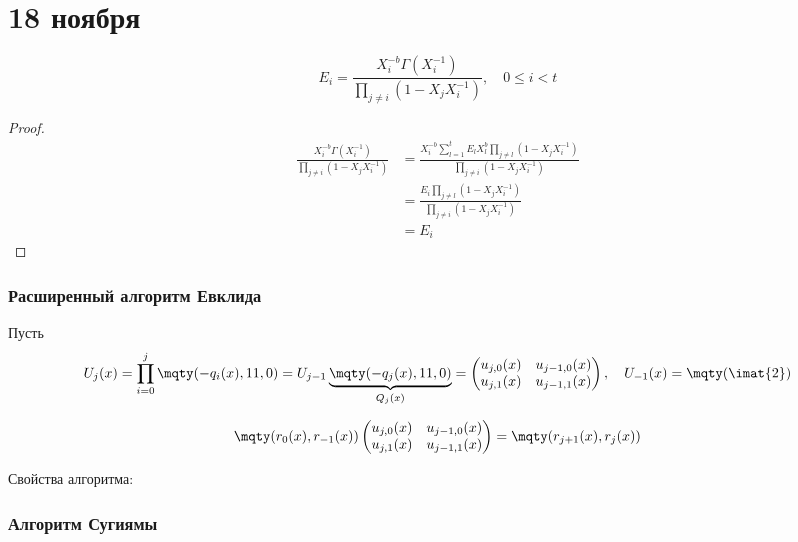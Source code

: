 \chapter{18 ноября}

\unfinished

\begin{theorem}
    \[E_i = \frac{X_i^{ -b} \Gamma(X_i^{-1})}{\prod_{j\neq i} (1 - X_j X_i^{-1})}, \quad 0 \leq i < t\]
\end{theorem}
\begin{proof}
    \begin{align*}
        \frac{X_i^{ -b} \Gamma(X_i^{-1})}{\prod_{j\neq i} (1 - X_j X_i^{-1})}
        & = \frac{X_i^{ -b} \sum_{l = 1}^t E_l X_l^b \prod_{j \neq l} (1 - X_jX_i^{-1})}{\prod_{j\neq i} (1 - X_j X_i^{-1})} \\
        & = \frac{E_i \prod_{j \neq l} (1 - X_jX_i^{-1})}{\prod_{j\neq i} (1 - X_j X_i^{-1})} \\
        & = E_i 
    \end{align*}
\end{proof}

\unfinished

\subsection{Расширенный алгоритм Евклида}

\unfinished

Пусть
\[U_j(x) = \prod_{i = 0}^j \mqty(-q_i(x),1\\1,0)
= U_{j-1} \underbrace{\mqty(-q_j(x),1\\1,0)}_{Q_j(x)}
= \begin{pmatrix}
    u_{j,0}(x) & u_{j -1,0}(x) \\
    u_{j,1}(x) & u_{j -1,1}(x)
\end{pmatrix}
, \quad U_{ - 1}(x) = \mqty(\imat{2})\]

\[\mqty(r_0(x),r_{ -1}(x)) \begin{pmatrix}
    u_{j,0}(x) & u_{j -1,0}(x) \\
    u_{j,1}(x) & u_{j -1,1}(x)
\end{pmatrix} = \mqty(r_{j+1}(x),r_j(x))\]

Свойства алгоритма:
\unfinished

\subsection{Алгоритм Сугиямы}

